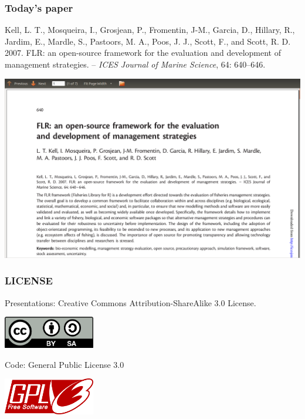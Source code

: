 \documentclass[ignorenonframetext,]{beamer}
\begin{document}
\begin{frame}\frametitle{Today's paper}

Kell, L. T., Mosqueira, I., Grosjean, P., Fromentin, J-M., Garcia, D.,
Hillary, R., Jardim, E., Mardle, S., Pastoors, M. A., Poos, J. J.,
Scott, F., and Scott, R. D. 2007. FLR: an open-source framework for the
evaluation and development of management strategies. -- \emph{ICES
Journal of Marine Science}, 64: 640--646.

\centering
\includegraphics[keepaspectratio, height=0.6\textheight]{graphics/kelletal.png}

\end{frame}

\begin{frame}\frametitle{LICENSE}

\begin{block}{Presentations: Creative Commons Attribution-ShareAlike 3.0
License.}

\centering
\includegraphics[keepaspectratio, width=0.3\textwidth]{graphics/cc-by-sa.png}

\end{block}

\begin{block}{Code: General Public License 3.0}

\centering
\includegraphics[keepaspectratio, width=0.3\textwidth]{graphics/gpl3.png}

\end{block}

\end{frame}
\end{document}
